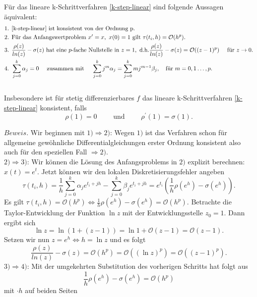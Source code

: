 \begin{satz}
    Für das lineare k-Schrittverfahren \eqref{k-step-linear} sind folgende Aussagen äquivalent:
    \begin{align*}
        &\text{1. } \eqref{k-step-linear} \text{ ist konsistent von der Ordnung p.}\\
        &\text{2. Für das Anfangswertproblem }
            x^{\prime} = x, \text{ }
            x(0) = 1
        \text{ gilt } \tau(t_i,h) = \mathcal{O}(h^p).\\
        &\text{3. } \frac{\rho(z)}{ln(z)} - \sigma(z) \text{ hat eine $p$-fache Nullstelle in } z= 1, \text{ d.h.}
            \frac{\rho(z)}{ln(z)} - \sigma(z) = \mathcal{O}((z-1)^p) \quad \text{ für } z \rightarrow 0.\\
        &\text{4. } \sum_{j=0}^{k} \alpha_j = 0 \quad \text{ zusammen mit } \quad
        \sum_{j=0}^{k} j^m \alpha_j = \sum_{j=0}^{k} mj^{m-1} \beta_j,  \quad \text{für } m=0,1 \dots, p.
    \end{align*}\\
    Insbesondere ist für stetig differenzierbares $f$ das lineare k-Schrittverfahren \eqref{k-step-linear} konsistent,
    falls
    \[
        \rho(1) = 0 \qquad \text{ und } \qquad \rho^{\prime}(1)=\sigma(1).
    \]
\end{satz}
$Beweis.$ Wir beginnen mit $1) \Rightarrow 2)$: Wegen $1)$ ist das Verfahren schon für allgemeine gewöhnliche
Differentialgleichungen erster Ordnung konsistent also auch für den speziellen Fall $\Rightarrow 2)$.\\
$2) \Rightarrow 3)$: Wir können die Lösung des Anfangsproblems in $2)$ explizit berechnen: $x(t)=e^{t}$. Jetzt können
wir den lokalen Diskretisierungsfehler angeben
\[
    \tau(t_i,h)= \frac{1}{h} \sum_{j=0}^{k} \alpha_j e^{t_i+jh} - \sum_{j=0}^{k} \beta_j e^{t_i+jh}
    = e^{t_i} \left( \frac{1}{h} \rho(e^h) - \sigma(e^{h}) \right).
\]
Es gilt $\tau(t_i,h)= \mathcal{O}(h^p) \Leftrightarrow \frac{1}{h} \rho(e^h) - \sigma(e^h) = \mathcal{O}(h^p)$.
Betrachte die Taylor-Entwicklung der Funktion $\ln z$ mit der Entwicklungsstelle $z_0 = 1$. Dann ergibt sich
\[
    \ln z = \ln (1 + (z-1)) = \ln 1 + \mathcal{O}(z-1) = \mathcal{O}(z-1).
\]
Setzen wir nun $z=e^h \Leftrightarrow h=\ln z$ und es folgt
\[
    \frac{\rho(z)}{ln(z)} - \sigma(z) = \mathcal{O}(h^p) = \mathcal{O}((\ln z)^p) = \mathcal{O}((z-1)^p).
\]
$3) \Rightarrow 4)$: Mit der umgekehrten Substitution des vorherigen Schritts hat folgt aus
\[
    \frac{1}{h} \rho(e^h) - \sigma(e^h) = \mathcal{O}(h^p)
\]
mit $\cdot h$ auf beiden Seiten
